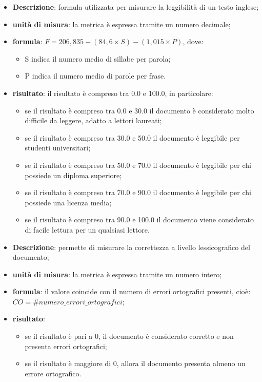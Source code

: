 		\begin{itemize}
			\item{\textbf{Descrizione}}: formula utilizzata per misurare la leggibilità di un testo inglese;
			\item{\textbf{unità di misura}}: la metrica è espressa tramite un numero decimale;
			\item{\textbf{formula}}: $ F = 206,835 - (84,6 \times S) - (1,015 \times P) $, dove: 
				\begin{itemize}
					\item S indica il numero medio di sillabe per parola; 
					\item P indica il numero medio di parole per frase. 
				\end{itemize}
			\item{\textbf{risultato}}: il risultato è compreso tra 0.0 e 100.0, in particolare: 
				\begin{itemize}
					\item se il risultato è compreso tra 0.0 e 30.0 il documento è considerato molto difficile da leggere, adatto a lettori laureati; 
					\item se il risultato è compreso tra 30.0 e 50.0 il documento è leggibile per studenti universitari; 
					\item se il risultato è compreso tra 50.0 e 70.0 il documento è leggibile per chi possiede un diploma superiore; 
					\item se il risultato è compreso tra 70.0 e 90.0 il documento è leggibile per chi possiede una licenza media; 
					\item se il risultato è compreso tra 90.0 e 100.0 il documento viene considerato di facile lettura per un qualsiasi lettore.
				\end{itemize}
		\end{itemize}
	
		\begin{itemize}
			\item{\textbf{Descrizione}}: permette di misurare la correttezza a livello lessicografico del documento;
			\item{\textbf{unità di misura}}: la metrica è espressa tramite un numero intero;
			\item{\textbf{formula}}: il valore coincide con il numero di errori ortografici presenti, cioè: $ CO = \#numero\_errori\_ortografici $;
			\item{\textbf{risultato}}: 
				\begin{itemize}
					\item se il risultato è pari a 0, il documento è considerato corretto e non presenta errori ortografici; 
					\item se il risultato è maggiore di 0, allora il documento presenta almeno un errore ortografico. 
				\end{itemize}
		\end{itemize}
	
